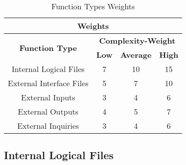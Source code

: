 \documentclass[../../../../projectPlan.tex]{subfiles}
\begin{document}
		\begin{table}[H]
		\centering
		\label{my-label}
		\begin{tabular}{cccc}
			\hline
			\multicolumn{4}{c}{\textbf{Weights}}                                                                           \\ \hline
			\multicolumn{1}{c|}{\multirow{2}{*}{\textbf{Function Type}}} & \multicolumn{3}{c|}{\textbf{Complexity-Weight}} \\
			\multicolumn{1}{c|}{}                                        & \textbf{Low} & \textbf{Average} & \textbf{High} \\ \hline
			\multicolumn{1}{c|}{Internal Logical Files}                  & 7            & 10               & 15            \\ \hline
			\multicolumn{1}{c|}{External Interface Files}                & 5            & 7                & 10            \\ \hline
			\multicolumn{1}{c|}{External Inputs}                         & 3            & 4                & 6             \\ \hline
			\multicolumn{1}{c|}{External Outputs}                        & 4            & 5                & 7             \\ \hline
			\multicolumn{1}{c|}{External Inquiries}                      & 3            & 4                & 6             \\ \hline
		\end{tabular}
		\caption{Function Types Weights}
		\end{table}

		\subsection{Internal Logical Files}
\end{document}
